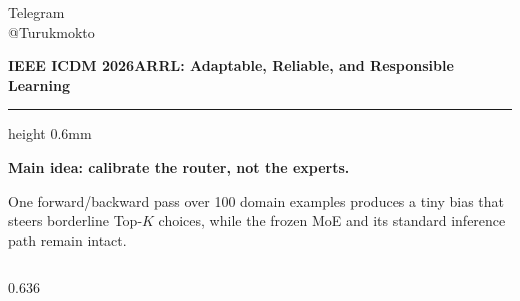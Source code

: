 \documentclass[final]{beamer}
\newcommand{\PosterSans}{\notosans}
\begin{document}
\begin{frame}[t]
\begin{minipage}[c]{0.145\textwidth}
\begin{minipage}[t]{0.48\linewidth}
{\PosterSans\fontsize{14}{18}\selectfont\color{PosterMuted}Telegram\\@Turukmokto}
\end{minipage}
\end{minipage}
\par\vspace{4mm}
{\PosterSans\bfseries\fontsize{23}{28}\selectfont\color{PosterBlue}
IEEE ICDM 2026\hfill ARRL: Adaptable, Reliable, and Responsible Learning}\par
\vspace{2mm}\hrule height 0.6mm\vspace{4mm}
\begin{tcolorbox}[
  enhanced,
  colback=PosterCharcoal,
  colframe=PosterCharcoal,
  boxrule=0pt,
  arc=3.8mm,
  left=9mm,
  right=9mm,
  top=4.5mm,
  bottom=4.5mm,
  before skip=0mm,
  after skip=0mm
]
  \centering

  {\PosterSans\bfseries\fontsize{40}{46}\selectfont\color{white}
  \faLightbulb[regular]\hspace{4mm}%
  Main idea: calibrate the router, not the experts.%
  \par}

  \vspace{1.4mm}

  {\PosterSans\fontsize{25.5}{31}\selectfont\color{white!93}
  One forward/backward pass over 100 domain examples produces a tiny
  bias that steers borderline Top-$K$ choices, while the frozen MoE
  and its standard inference path remain intact.%
  \par}
\end{tcolorbox}

\par
\vspace{9.0mm}

\begin{columns}[T,onlytextwidth]

\begin{column}{0.636\textwidth}
\begin{minipage}[t][88cm][s]{\linewidth}


\end{minipage}
\end{column}
\end{columns}
\end{frame}
\end{document}
